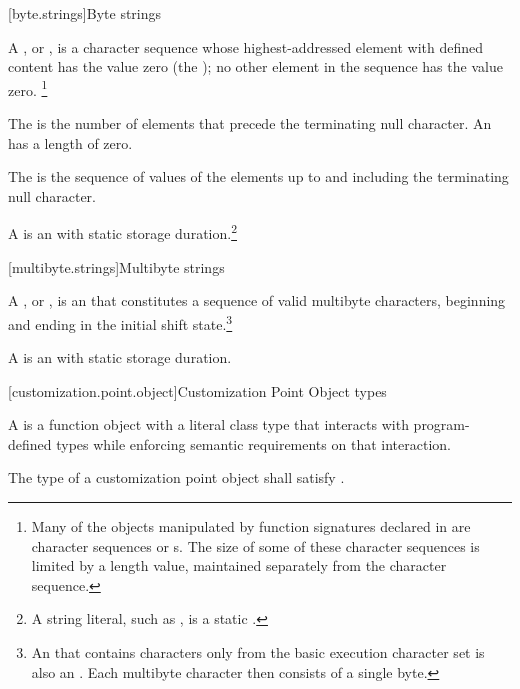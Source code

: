 [byte.strings]{Byte strings}

%
\pnum
A ,
or \ntbs{},
is a character sequence whose highest-addressed element
with defined content has the value zero
(the );
no other element in the sequence has the value zero.%
%
\footnote{Many of the objects manipulated by
function signatures declared in
 are character sequences or \ntbs{}s.
%
The size of some of these character sequences is limited by
a length value, maintained separately from the character sequence.}

\pnum
The 
is the number of elements that
precede the terminating null character.
An 
has a length of zero.

\pnum
The 
is the sequence of values of the
elements up to and including the terminating null character.

\pnum
A 
is an \ntbs{} with
static storage duration.\footnote{A string literal, such as
,
is a static \ntbs{}.}

[multibyte.strings]{Multibyte strings}

%
\pnum
A ,
or \ntmbs{},
is an \ntbs{} that constitutes a
sequence of valid multibyte characters, beginning and ending in the initial
shift state.\footnote{An \ntbs{} that contains characters only from the
basic execution character set is also an \ntmbs{}.
Each multibyte character then
consists of a single byte.}

\pnum
A 
is an \ntmbs{} with static storage duration.

[customization.point.object]{Customization Point Object types}

\pnum
A  is a function object
with a literal class type that interacts with program-defined types while
enforcing semantic requirements on that interaction.

\pnum
The type of a customization point object shall satisfy
.

